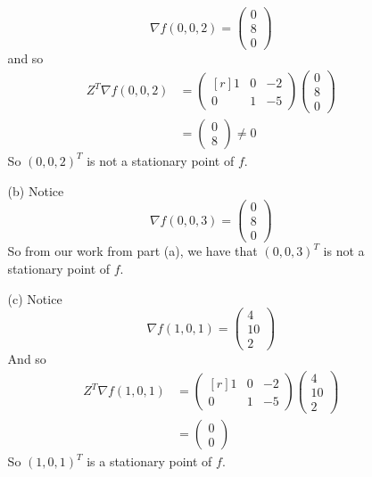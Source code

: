 \documentclass{article}
\begin{document}
\begin{itemize}
\begin{itemize}
        \[\nabla f(0,0,2) = \begin{pmatrix}
            0\\
            8\\
            0
        \end{pmatrix}\]
        and so
        \begin{align*}
            Z^T\nabla f(0,0,2) &= \begin{pmatrix*}[r]
                1 & 0 & -2\\
                0 & 1 & -5
            \end{pmatrix*}
            \begin{pmatrix}
                0\\
                8\\
                0
            \end{pmatrix}\\
            &= \begin{pmatrix}
                0\\
                8
            \end{pmatrix}
            \neq 0
        \end{align*}
        So $(0,0,2)^T$ is not a stationary point of $f$.


        \item[(b)] Notice 
        \[\nabla f(0,0,3) = \begin{pmatrix}
            0\\
            8\\
            0
        \end{pmatrix}\]
        So from our work from part (a), we have that $(0,0,3)^T$ is not a stationary point of $f$.

        \item[(c)] Notice
        \[\nabla f(1,0,1) = \begin{pmatrix}
            4\\
            10\\
            2
        \end{pmatrix}\]
        And so
        \begin{align*}
            Z^T\nabla f(1,0,1) &= \begin{pmatrix*}[r]
                1 & 0 & -2\\
                0 & 1 & -5
            \end{pmatrix*}
            \begin{pmatrix}
                4\\
                10\\
                2
            \end{pmatrix}\\
            &= \begin{pmatrix}
                0\\
                0
            \end{pmatrix}
        \end{align*}      
        So $(1,0,1)^T$ is a stationary point of $f$.
    \end{itemize}


\end{itemize}
\end{document}
